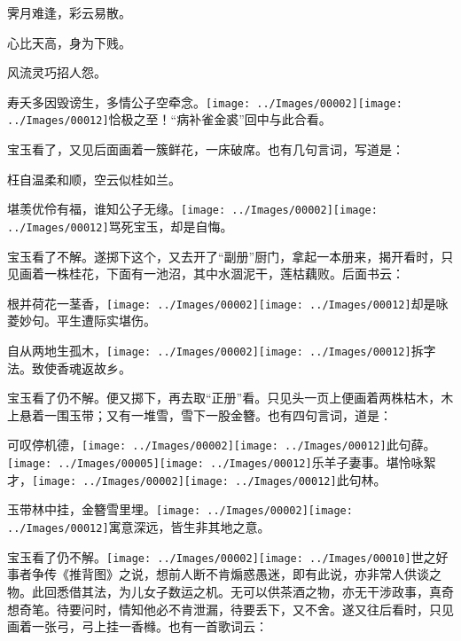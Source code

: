 霁月难逢，彩云易散。

心比天高，身为下贱。

风流灵巧招人怨。

寿夭多因毁谤生，多情公子空牵念。{\texttt{[image: ../Images/00002]}\texttt{[image: ../Images/00012]}\footnotesize \kaishu 恰极之至！``病补雀金裘''回中与此合看。}

宝玉看了，又见后面画着一簇鲜花，一床破席。也有几句言词，写道是：

枉自温柔和顺，空云似桂如兰。

堪羡优伶有福，谁知公子无缘。{\texttt{[image: ../Images/00002]}\texttt{[image: ../Images/00012]}\footnotesize \kaishu 骂死宝玉，却是自悔。}

宝玉看了不解。遂掷下这个，又去开了``副册''厨门，拿起一本册来，揭开看时，只见画着一株桂花，下面有一池沼，其中水涸泥干，莲枯藕败。后面书云：

根并荷花一茎香，{\texttt{[image: ../Images/00002]}\texttt{[image: ../Images/00012]}\footnotesize \kaishu 却是咏菱妙句。}平生遭际实堪伤。

自从两地生孤木，{\texttt{[image: ../Images/00002]}\texttt{[image: ../Images/00012]}\footnotesize \kaishu 拆字法。}致使香魂返故乡。

宝玉看了仍不解。便又掷下，再去取``正册''看。只见头一页上便画着两株枯木，木上悬着一围玉带；又有一堆雪，雪下一股金簪。也有四句言词，道是：

可叹停机德，{{\texttt{[image: ../Images/00002]}\texttt{[image: ../Images/00012]}\footnotesize \kaishu 此句薛。　}\texttt{[image: ../Images/00005]}\texttt{[image: ../Images/00012]}\footnotesize \kaishu 乐羊子妻事。}堪怜咏絮才，{\texttt{[image: ../Images/00002]}\texttt{[image: ../Images/00012]}\footnotesize \kaishu 此句林。}

玉带林中挂，金簪雪里埋。{\texttt{[image: ../Images/00002]}\texttt{[image: ../Images/00012]}\footnotesize \kaishu 寓意深远，皆生非其地之意。}

宝玉看了仍不解。{\texttt{[image: ../Images/00002]}\texttt{[image: ../Images/00010]}\footnotesize \kaishu 世之好事者争传《推背图》之说，想前人断不肯煽惑愚迷，即有此说，亦非常人供谈之物。此回悉借其法，为儿女子数运之机。无可以供茶酒之物，亦无干涉政事，真奇想奇笔。}待要问时，情知他必不肯泄漏，待要丢下，又不舍。遂又往后看时，只见画着一张弓，弓上挂一香橼。也有一首歌词云：

